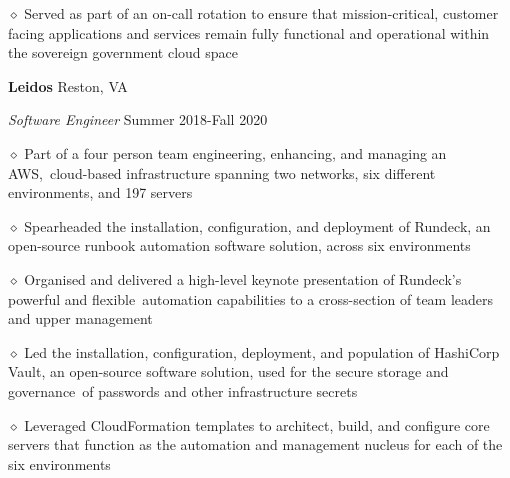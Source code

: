 \documentclass[executivepaper]{extarticle}
\begin{document}
\begin{center}
{\begin{minipage}{7.0in}
{\noindent $\diamond$ {\fontsize{12}{8}\selectfont Served as part of an on-call rotation to ensure that mission-critical, customer facing applications and services remain fully functional and operational within the sovereign government cloud space}}

\vspace{2mm}

{\noindent \textbf{\fontsize{12}{8}\selectfont Leidos}} {\hfill \fontsize{10}{8}\selectfont Reston, VA}

\vspace{0.5mm}

{\noindent \textit{\fontsize{12}{8}\selectfont Software Engineer}} {\hfill \fontsize{10}{8}\selectfont Summer 2018-Fall 2020}

\vspace{0.5mm}

{\noindent $\diamond$ {\fontsize{12}{8}\selectfont Part of a four person team engineering, enhancing, and managing an AWS, cloud-based infrastructure spanning two networks, six different environments, and 197 servers}}

\vspace{1mm}

{\noindent $\diamond$ {\fontsize{12}{8}\selectfont Spearheaded the installation, configuration, and deployment of Rundeck, an open-source runbook automation software solution, across six environments}}

\vspace{1mm}

{\noindent $\diamond$ {\fontsize{12}{8}\selectfont Organised and delivered a high-level keynote presentation of Rundeck's powerful and flexible automation capabilities to a cross-section of team leaders and upper management}}

\vspace{1mm}

{\noindent $\diamond$ {\fontsize{12}{8}\selectfont Led the installation, configuration, deployment, and population of HashiCorp Vault, an open-source software solution, used for the secure storage and governance of passwords and other infrastructure secrets}}

\vspace{1mm}

{\noindent $\diamond$ {\fontsize{12}{8}\selectfont Leveraged CloudFormation templates to architect, build, and configure core servers that function as the automation and management nucleus for each of the six environments}}


\end{minipage}}
\end{center}
\end{document}
